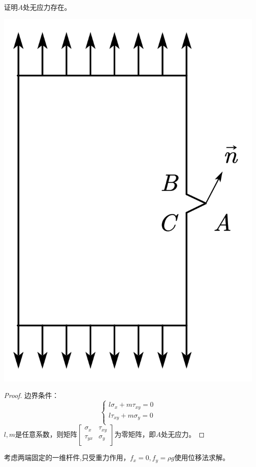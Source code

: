 \begin{example}
	证明$A$处无应力存在。
\end{example}
\centerline{\includegraphics[scale=0.4]{figure/2-7.png}}
\begin{proof}
	边界条件：\[\begin{cases}
	l\sigma _x+m\tau _{xy}=0\\
	l\tau _{xy}+m\sigma _y=0\\
	\end{cases}\]
	$l,m$是任意系数，则矩阵$\left[ \begin{matrix}
	\sigma _x&		\tau _{xy}\\
	\tau _{yx}&		\sigma _y\\
	\end{matrix} \right] $为零矩阵，即$A$处无应力。
\end{proof}
\begin{example}
	考虑两端固定的一维杆件,只受重力作用，$f_x=0,f_y=\rho g$使用位移法求解。
\end{example}
